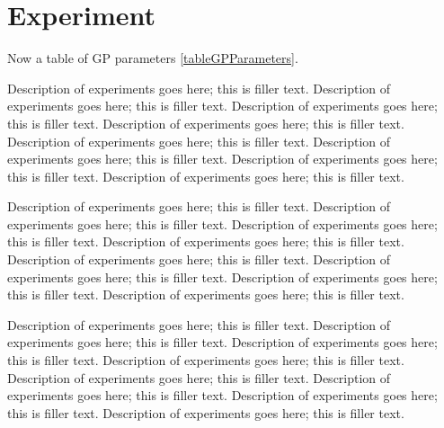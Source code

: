 \documentclass{sig-alternate}
\begin{document}
\section{Experiment}

Now a table of GP parameters \ref{tableGPParameters}.

Description of experiments goes here; this is filler text. Description of experiments goes here; this is filler text. Description of experiments goes here; this is filler text. Description of experiments goes here; this is filler text. Description of experiments goes here; this is filler text. Description of experiments goes here; this is filler text. Description of experiments goes here; this is filler text. Description of experiments goes here; this is filler text.

Description of experiments goes here; this is filler text. Description of experiments goes here; this is filler text. Description of experiments goes here; this is filler text. Description of experiments goes here; this is filler text. Description of experiments goes here; this is filler text. Description of experiments goes here; this is filler text. Description of experiments goes here; this is filler text. Description of experiments goes here; this is filler text.

Description of experiments goes here; this is filler text. Description of experiments goes here; this is filler text. Description of experiments goes here; this is filler text. Description of experiments goes here; this is filler text. Description of experiments goes here; this is filler text. Description of experiments goes here; this is filler text. Description of experiments goes here; this is filler text. Description of experiments goes here; this is filler text.
\end{document}
